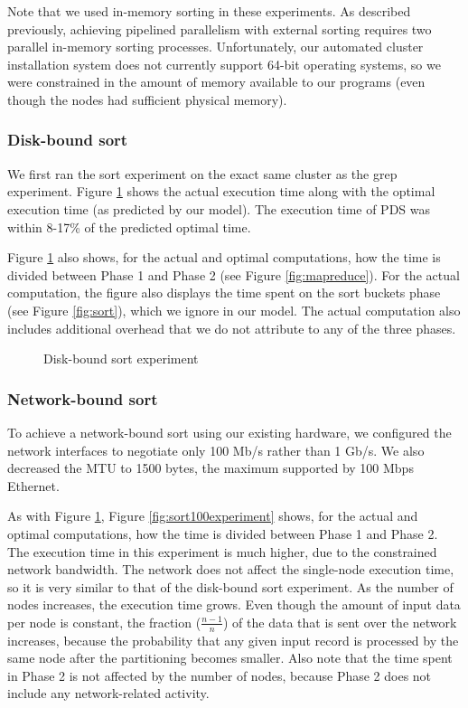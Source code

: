 \documentclass[ 11pt, letterpaper]{article}%
\begin{document}
Note that we used in-memory sorting in these experiments.
As described previously, achieving pipelined parallelism with external sorting
requires two parallel in-memory sorting processes. Unfortunately, our automated
cluster installation system does not currently support 64-bit operating
systems, so we were constrained in the amount of memory available to our
programs (even though the nodes had sufficient physical memory).

\subsubsection{Disk-bound sort}

We first ran the sort experiment on the exact same cluster as the grep
experiment. Figure \ref{fig:sort1000experiment} shows the actual execution time along with the optimal
execution time (as predicted by our model). The execution time of PDS was
within 8-17\% of the predicted optimal time.

Figure \ref{fig:sort1000experiment} also shows, for the actual and optimal
computations, how the time is divided between Phase 1 and Phase 2 (see Figure \ref{fig:mapreduce}). For the actual computation, the
figure also displays the time spent on the sort buckets phase (see
Figure \ref{fig:sort}), which we ignore in our model. The actual computation
also includes additional overhead that we do not attribute to
any of the three phases.

\begin{figure}
\begin{center}
\caption{Disk-bound sort experiment}
\label{fig:sort1000experiment}
\end{center}
\end{figure}

\subsubsection{Network-bound sort}

To achieve a network-bound sort using our existing hardware, we
configured the network interfaces to negotiate only 100 Mb/s rather than 1 Gb/s. We also decreased the
MTU to 1500 bytes, the maximum supported by 100 Mbps Ethernet.

As with Figure \ref{fig:sort1000experiment}, Figure \ref{fig:sort100experiment}
shows, for the actual and optimal computations, how the time is divided between Phase 1 and Phase 2. The execution time in this experiment is much higher, due to the
constrained network bandwidth. The network does not affect the single-node
execution time, so it is very similar to that of the disk-bound sort
experiment. As the number of nodes increases, the execution time
grows. Even though the amount of input data per node is constant, the fraction
($\frac{n-1}{n}$) of the data that is sent over the network increases, because
the probability that any given input record is processed by the same node after
the partitioning becomes smaller. Also note that the time spent in Phase 2 is
not affected by the number of nodes, because Phase 2 does not include any
network-related activity.
\end{document}
